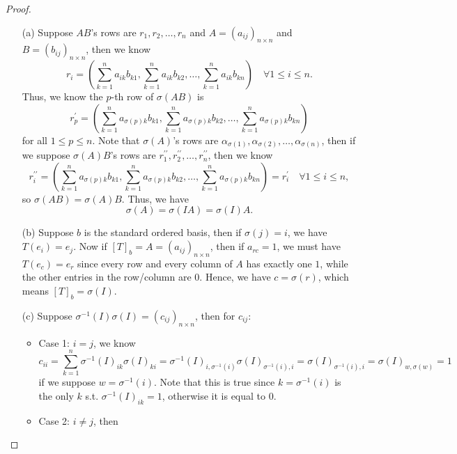 \begin{proof}
    \vphantom{text}
    \begin{itemize}
        \item [(a)] Suppose \(AB\)'s rows are \(r_1, r_2, \dots , r_n\) and \(A = (a_{ij})_{n \times n}\) and \(B = (b_{ij})_{n \times n}\), then we know 
        \[
            r_i = \left( \sum_{k=1}^n a_{ik} b_{k1}, \sum_{k=1}^n a_{ik} b_{k2}, \dots , \sum_{k=1}^n a_{ik} b_{kn} \right) \quad \forall 1 \le i \le n. 
        \]
        Thus, we know the \(p\)-th row of \(\sigma (AB)\) is 
        \[
            r_p^{\prime} = \left( \sum_{k=1}^n a_{\sigma (p) k} b_{k1}, \sum_{k=1}^n a_{\sigma (p) k} b_{k2}, \dots , \sum_{k=1}^n a_{\sigma(p) k} b_{kn} \right) 
        \]  for all \(1 \le p \le n\). Note that \(\sigma (A)\)'s rows are \(\alpha _{\sigma (1)}, \alpha _{\sigma (2)}, \dots , \alpha _{\sigma (n)}\), then if we suppose \(\sigma (A) B\)'s rows are \(r_1^{\prime\prime}  , r_2^{\prime\prime}  , \dots , r_n^{\prime\prime} \), then we know 
        \[
            r_i^{\prime\prime} = \left( \sum_{k=1}^n a_{\sigma (p) k} b_{k1}, \sum_{k=1}^n a_{\sigma (p) k} b_{k2}, \dots , \sum_{k=1}^n a_{\sigma(p) k} b_{kn} \right) = r_i^{\prime} \quad \forall 1 \le i \le n, 
        \] so \(\sigma (AB) = \sigma (A) B\). Thus, we have 
        \[
            \sigma (A) = \sigma (I A) = \sigma (I) A.
        \] 
        \item [(b)] Suppose \(b\) is the standard ordered basis, then if \(\sigma (j) = i\), we have \(T(e_i) = e_j\). Now if \([T]_b = A = (a_{ij})_{n \times n}\), then if \(a_{rc} = 1\), we must have \(T(e_c) = e_r\) since every row and every column of \(A\) has exactly one \(1\), while the other entries in the row/column are \(0\). Hence, we have \(c = \sigma (r)\), which means \([T]_b = \sigma (I)\).           
        \item [(c)] Suppose \(\sigma ^{-1}(I) \sigma (I) = (c_{ij})_{n \times n}\), then for \(c_{ij}\):
        \begin{itemize}
            \item Case 1: \(i = j\), we know 
            \[
                c_{ii} = \sum_{k=1}^n \sigma ^{-1}(I)_{ik} \sigma (I)_{ki} = \sigma ^{-1}(I)_{i, \sigma ^{-1}(i)} \sigma (I)_{\sigma ^{-1}(i), i} = \sigma (I)_{\sigma ^{-1}(i), i} = \sigma (I)_{w, \sigma (w)} = 1 
            \] if we suppose \(w = \sigma ^{-1}(i)\). Note that this is true since \(k = \sigma ^{-1}(i)\) is the only \(k\) s.t. \(\sigma ^{-1}(I)_{ik} = 1\), otherwise it is equal to \(0\). 
            \item Case 2: \(i \neq j\), then 

\end{itemize}
\end{itemize}
\end{proof}
